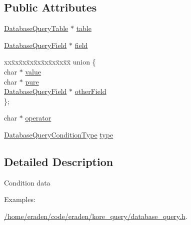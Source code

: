\subsection*{Public Attributes}
\begin{DoxyCompactItemize}
\item 
\hyperlink{database__query_8h_a38971f81715db3c243144b5e840c2457}{Database\+Query\+Table} $\ast$ \hyperlink{structsDatabaseQueryCondition_a5b0abcb43e1a341d7fe41cd2fb234c00}{table}
\item 
\hyperlink{database__query_8h_a88215d743b6fc63a879f730b4523dda1}{Database\+Query\+Field} $\ast$ \hyperlink{structsDatabaseQueryCondition_a0899760067fd45e1e4a8924eed57e819}{field}
\item 
\begin{tabbing}
xx\=xx\=xx\=xx\=xx\=xx\=xx\=xx\=xx\=\kill
union \{\\
\>char $\ast$ \hyperlink{structsDatabaseQueryCondition_ad1d67fc6c2a74d0e87db06350f2f40ee}{value}\\
\>char $\ast$ \hyperlink{structsDatabaseQueryCondition_ad17cff86f0e111e5d465675dc1e804a5}{pure}\\
\>\hyperlink{database__query_8h_a88215d743b6fc63a879f730b4523dda1}{DatabaseQueryField} $\ast$ \hyperlink{structsDatabaseQueryCondition_aabc526568a4ba78b32ca64982bbd4813}{otherField}\\
\}; \hypertarget{structsDatabaseQueryCondition_acc2dfbe9fa14322203a54d89a9d467c5}{}\label{structsDatabaseQueryCondition_acc2dfbe9fa14322203a54d89a9d467c5}
\\

\end{tabbing}\item 
char $\ast$ \hyperlink{structsDatabaseQueryCondition_aa252b90ac14f012ce02078dda403309d}{operator}
\item 
\hyperlink{database__query_8h_a49f5d4b3f84e7b0e5c7a05d6c14c6ce2}{Database\+Query\+Condition\+Type} \hyperlink{structsDatabaseQueryCondition_a0d735a2c898a27fad8367293125349e6}{type}
\end{DoxyCompactItemize}


\subsection{Detailed Description}
Condition data \begin{Desc}
\item[Examples\+: ]\par
\hyperlink{_2home_2eraden_2code_2eraden_2kore_query_2database_query_8h-example}{/home/eraden/code/eraden/kore\+\_\+query/database\+\_\+query.\+h}.\end{Desc}


